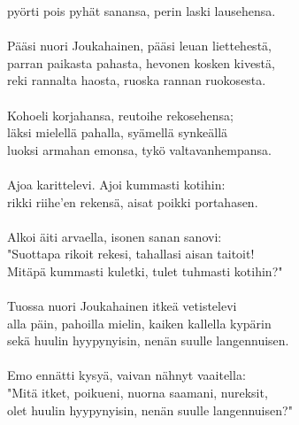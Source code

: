 pyörti pois pyhät sanansa, perin laski lausehensa.            \\
                                                              \\
Pääsi nuori Joukahainen, pääsi leuan liettehestä,             \\
parran paikasta pahasta, hevonen kosken kivestä,              \\
reki rannalta haosta, ruoska rannan ruokosesta.               \\
                                                              \\
Kohoeli korjahansa, reutoihe rekosehensa;                     \\
läksi mielellä pahalla, syämellä synkeällä                    \\
luoksi armahan emonsa, tykö valtavanhempansa.                 \\
                                                              \\
Ajoa karittelevi. Ajoi kummasti kotihin:                      \\
rikki riihe'en rekensä, aisat poikki portahasen.              \\
                                                              \\
Alkoi äiti arvaella, isonen sanan sanovi:                     \\
"Suottapa rikoit rekesi, tahallasi aisan taitoit!             \\
Mitäpä kummasti kuletki, tulet tuhmasti kotihin?"             \\
                                                              \\
Tuossa nuori Joukahainen itkeä vetistelevi                    \\
alla päin, pahoilla mielin, kaiken kallella kypärin           \\
sekä huulin hyypynyisin, nenän suulle langennuisen.           \\
                                                              \\
Emo ennätti kysyä, vaivan nähnyt vaaitella:                   \\
"Mitä itket, poikueni, nuorna saamani, nureksit,              \\
olet huulin hyypynyisin, nenän suulle langennuisen?"          \\
                                                              \\
